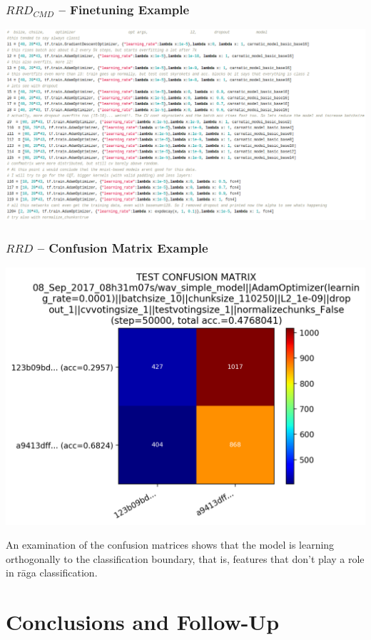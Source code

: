\documentclass[hyperref={pdfpagelabels=false}]{beamer}
\begin{document}
\begin{frame}
    \frametitle{$RRD_{CMD}$ -- Finetuning Example}
    \centering
    \includegraphics[scale=0.37]{finetuning_caption.png}
  \end{frame}



  \begin{frame}
    \frametitle{$RRD$ -- Confusion Matrix Example}
    \centering
    \includegraphics[scale=0.18]{confmat_class2.png}
    \begin{block}{}
      An examination of the confusion matrices shows that the model is learning orthogonally to the classification boundary, that is, features that don't play a role in r\=aga classification.
    \end{block}
  \end{frame}


     \section{Conclusions and Follow-Up}
     \frame{\sectionpage}
\end{document}
